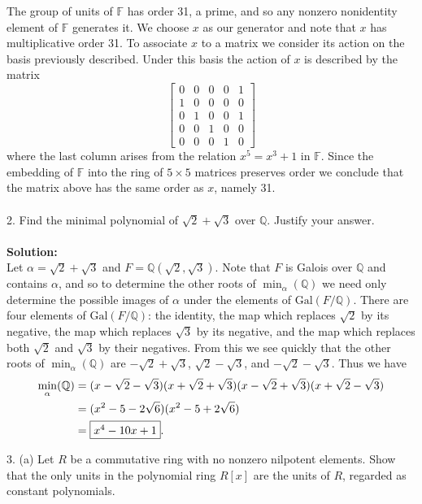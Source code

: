 \documentclass[11pt]{article}
\newcommand{\Q}{\mathbb{Q}}
\newcommand{\F}{\mathbb{F}}
\begin{document}
The group of units of $\F$ has order 31, a prime, and so any nonzero nonidentity element of $\F$ generates it. We choose $x$ as our generator and note that $x$ has multiplicative order 31. To associate $x$ to a matrix we consider its action on the basis previously described. Under this basis the action of $x$ is described by the matrix \[
\begin{bmatrix}
0&0&0&0&1\\
1&0&0&0&0\\
0&1&0&0&1\\
0&0&1&0&0\\
0&0&0&1&0
\end{bmatrix}
\]
where the last column arises from the relation $x^5 = x^3+1$ in $\F$. Since the embedding of $\F$ into the ring of $5\times 5$ matrices preserves order we conclude that the matrix above has the same order as $x$, namely 31. \\\\

2. Find the minimal polynomial of $\sqrt{2}+\sqrt{3}$ over $\Q$. Justify your answer.\\\\
\textbf{Solution:}\\
Let $\alpha = \sqrt{2}+\sqrt{3}$ and $F = \Q(\sqrt{2},\sqrt{3})$. Note that $F$ is Galois over $\Q$ and contains $\alpha$, and so to determine the other roots of $\min_\alpha(\Q)$ we need only determine the possible images of $\alpha$ under the elements of $\mbox{Gal}(F/\Q)$. There are four elements of $\mbox{Gal}(F/\Q)$: the identity, the map which replaces $\sqrt{2}$ by its negative, the map which replaces $\sqrt{3}$ by its negative, and the map which replaces both $\sqrt{2}$ and $\sqrt{3}$ by their negatives. From this we see quickly that the other roots of $\min_\alpha(\Q)$ are $-\sqrt{2}+\sqrt{3}$, $\sqrt{2}-\sqrt{3}$, and $-\sqrt{2}-\sqrt{3}$. Thus we have \begin{align*}
\min_\alpha(\Q) &= (x-\sqrt{2}-\sqrt{3})(x+\sqrt{2}+\sqrt{3})(x-\sqrt{2}+\sqrt{3})(x+\sqrt{2}-\sqrt{3})\\
& = (x^2 - 5 - 2\sqrt{6})(x^2 -5+2\sqrt{6})\\
& = \fbox{$x^4 -10x +1$}.
\end{align*}
\newpage

3. (a) Let $R$ be a commutative ring with no nonzero nilpotent elements. Show
that the only units in the polynomial ring $R[x]$ are the units of $R$, regarded as
constant polynomials.
\end{document}

